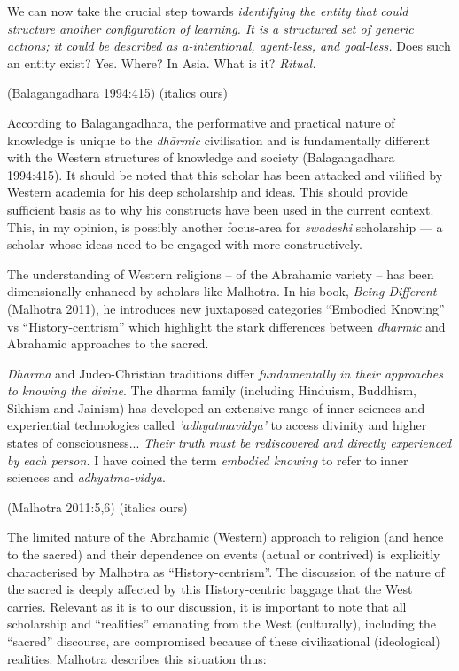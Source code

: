 \begin{myquote}
We can now take the crucial step towards \textit{identifying the entity that could structure another configuration of learning. It is a structured set of generic actions; it could be described as a-intentional, agent-less, and goal-less.} Does such an entity exist? Yes. Where? In Asia. What is it? \textit{Ritual.}
\end{myquote}

\hfill (Balagangadhara 1994:415) (italics ours)

According to Balagangadhara, the performative and practical nature of knowledge is unique to the \textit{dhārmic} civilisation and is fundamentally different with the Western structures of knowledge and society (Balagangadhara 1994:415). It should be noted that this scholar has been attacked and vilified by Western academia for his deep scholarship and ideas. This should provide sufficient basis as to why his constructs have been used in the current context. This, in my opinion, is possibly another focus-area for \textit{swadeshi} scholarship — a scholar whose ideas need to be engaged with more constructively.

The understanding of Western religions – of the Abrahamic variety – has been dimensionally enhanced by scholars like Malhotra. In his book, \textit{Being Different} (Malhotra 2011), he introduces new juxtaposed categories “Embodied Knowing” vs “History-centrism” which highlight the stark differences between \textit{dhārmic} and Abrahamic approaches to the sacred.

\begin{myquote}
\textit{Dharma} and Judeo-Christian traditions differ \textit{fundamentally in their approaches to knowing the divine}. The dharma family (including Hinduism, Buddhism, Sikhism and Jainism) has developed an extensive range of inner sciences and experiential technologies called \textit{'adhyatmavidya'} to access divinity and higher states of consciousness... \textit{Their truth must be rediscovered and directly experienced by each person.} I have coined the term \textit{embodied knowing} to refer to inner sciences and \textit{adhyatma-vidya}.
\end{myquote}

\hfill (Malhotra 2011:5,6) (italics ours)

The limited nature of the Abrahamic (Western) approach to religion (and hence to the sacred) and their dependence on events (actual or contrived) is explicitly characterised by Malhotra as “History-centrism”. The discussion of the nature of the sacred is deeply affected by this History-centric baggage that the West carries. Relevant as it is to our discussion, it is important to note that all scholarship and “realities” emanating from the West (culturally), including the “sacred” discourse, are compromised because of these civilizational (ideological) realities. Malhotra describes this situation thus:

